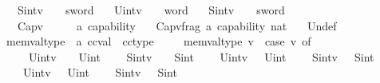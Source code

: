 \begin{isabellebody}
\ \ {\isacharbar}{\kern0pt}\ Sint{}{}{\isacharunderscore}{\kern0pt}v\ \ \ {\isachardoublequoteopen}{}{}\ sword{\isachardoublequoteclose}\isanewline
\ \ {\isacharbar}{\kern0pt}\ Uint{}{}{\isacharunderscore}{\kern0pt}v\ \ \ {\isachardoublequoteopen}{}{}\ word{\isachardoublequoteclose}\isanewline
\ \ {\isacharbar}{\kern0pt}\ Sint{}{}{\isacharunderscore}{\kern0pt}v\ \ \ {\isachardoublequoteopen}{}{}\ sword{\isachardoublequoteclose}\isanewline
\ \ {\isacharbar}{\kern0pt}\ Cap{\isacharunderscore}{\kern0pt}v\ \ \ \ \ \ {\isachardoublequoteopen}{\isacharprime}{\kern0pt}a\ capability{\isachardoublequoteclose}\isanewline
\ \ {\isacharbar}{\kern0pt}\ Cap{\isacharunderscore}{\kern0pt}v{\isacharunderscore}{\kern0pt}frag\ {\isachardoublequoteopen}{\isacharprime}{\kern0pt}a\ capability{\isachardoublequoteclose}\ {\isachardoublequoteopen}nat{\isachardoublequoteclose}\isanewline
\ \ {\isacharbar}{\kern0pt}\ Undef\isanewline
\isanewline
{}\isamarkupfalse%
\ memval{\isacharunderscore}{\kern0pt}type\ {\isacharcolon}{\kern0pt}{\isacharcolon}{\kern0pt}\ {\isachardoublequoteopen}{\isacharprime}{\kern0pt}a\ ccval\ {\isasymRightarrow}\ cctype{\isachardoublequoteclose}\isanewline
\ \ \isanewline
\ \ {\isachardoublequoteopen}memval{\isacharunderscore}{\kern0pt}type\ v\ {\isacharequal}{\kern0pt}\ {\isacharparenleft}{\kern0pt}case\ v\ of\ \isanewline
\ \ \ \ \ Uint{}{\isacharunderscore}{\kern0pt}v\ \ {\isacharunderscore}{\kern0pt}\ {\isasymRightarrow}\ Uint{}\isanewline
\ \ \ {\isacharbar}{\kern0pt}\ Sint{}{\isacharunderscore}{\kern0pt}v\ \ {\isacharunderscore}{\kern0pt}\ {\isasymRightarrow}\ Sint{}\isanewline
\ \ \ {\isacharbar}{\kern0pt}\ Uint{}{}{\isacharunderscore}{\kern0pt}v\ {\isacharunderscore}{\kern0pt}\ {\isasymRightarrow}\ Uint{}{}\isanewline
\ \ \ {\isacharbar}{\kern0pt}\ Sint{}{}{\isacharunderscore}{\kern0pt}v\ {\isacharunderscore}{\kern0pt}\ {\isasymRightarrow}\ Sint{}{}\isanewline
\ \ \ {\isacharbar}{\kern0pt}\ Uint{}{}{\isacharunderscore}{\kern0pt}v\ {\isacharunderscore}{\kern0pt}\ {\isasymRightarrow}\ Uint{}{}\isanewline
\ \ \ {\isacharbar}{\kern0pt}\ Sint{}{}{\isacharunderscore}{\kern0pt}v\ {\isacharunderscore}{\kern0pt}\ {\isasymRightarrow}\ Sint{}{}\isanewline

\end{isabellebody}
